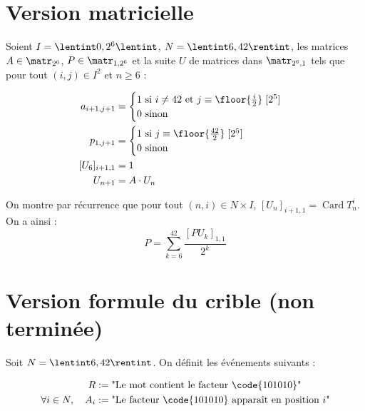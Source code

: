\documentclass{hibiscus}
\DeclareMathOperator{\Card}{Card}
\begin{document}
\section{Version matricielle}

\par \medskip Soient $I = \lentint 0, 2^6 \lentint$, $N = \lentint 6, 42 \rentint$, les matrices $A \in \matr_{2^6}$, $P \in \matr_{1, 2^6}$ et la suite $U$ de matrices dans $\matr_{2^6, 1}$ tels que pour tout $(i, j) \in I^2$ et $n \geq 6$ :

\begin{equation*}
\begin{aligned}
a_{i+1, j+1} & =
\begin{cases}
1 \text{ si } i \neq 42 \text{ et } j \equiv \floor{\frac{i}{2}} \; [2^5] \\
0 \text{ sinon}
\end{cases} \\
p_{1, j+1} & =
\begin{cases}
1 \text{ si } j \equiv \floor{\frac{42}{2}} \; [2^5] \\
0 \text{ sinon}
\end{cases} \\
[U_6]_{i+1, 1} & = 1 \\
U_{n+1} & = A \cdot U_n
\end{aligned}
\end{equation*}

\par \medskip On montre par récurrence que pour tout $(n, i) \in N \times I$, $ [U_n]_{i+1, 1} = \Card T_n^i $. On a ainsi :
$$ P = \sum_{k = 6}^{42}{\frac{[PU_k]_{1, 1}}{2^k}} $$

\section{Version formule du crible (non terminée)}

\par \medskip Soit $N = \lentint 6, 42 \rentint$. On définit les événements suivants :

\begin{equation*}
\begin{aligned}
R & := \text{"Le mot contient le facteur \code{101010}"} \\
\forall i \in N, \quad A_i & := \text{"Le facteur \code{101010} apparaît en position $i$"}
\end{aligned}
\end{equation*}
\end{document}
